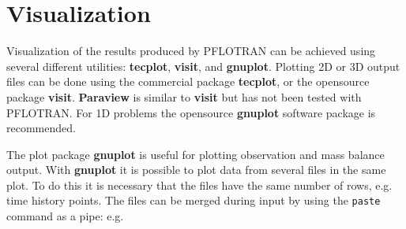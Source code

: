 \documentclass[12pt]{article}
\begin{document}

\normalsize

\section{Visualization}

Visualization of the results produced by PFLOTRAN can be achieved using several different utilities: {\bf tecplot}, {\bf visit}, and {\bf gnuplot}. Plotting 2D or 3D output files can be done using the commercial package {\bf tecplot}, or the opensource package {\bf visit}. {\bf Paraview} is similar to {\bf visit} but has not been tested with PFLOTRAN. For 1D problems the opensource {\bf gnuplot} software package is recommended.

The plot package {\bf gnuplot} is useful for plotting observation and mass balance output. With {\bf gnuplot} it is possible to plot data from several files in the same plot.
To do this it is necessary that the files have the same number of rows, e.g. time history points. The files can be merged during input by using the {\tt paste} command as a pipe: e.g.
\end{document}
